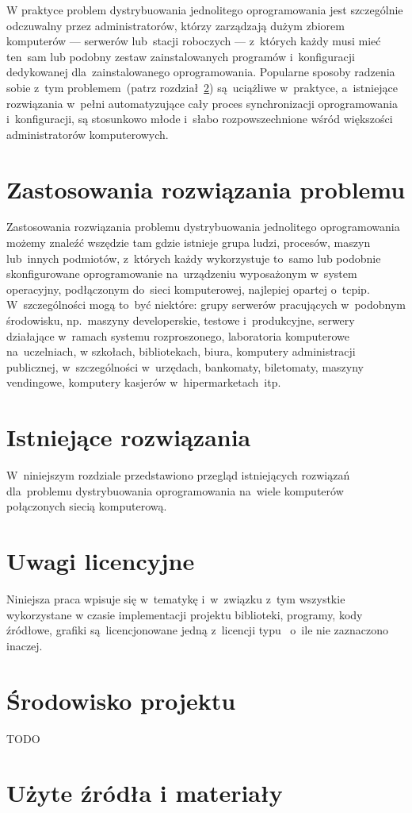 \documentclass[praca_magisterska]{subfiles}
\begin{document}
W praktyce problem dystrybuowania jednolitego oprogramowania jest szczególnie odczuwalny przez administratorów, którzy zarządzają dużym zbiorem komputerów --- serwerów lub~stacji roboczych --- z~których każdy musi mieć ten~sam lub podobny zestaw zainstalowanych programów i~konfiguracji dedykowanej dla~zainstalowanego oprogramowania. Popularne sposoby radzenia sobie z~tym problemem~(patrz rozdział~\ref{sec:istniejace-rozwiazania}) są~uciążliwe w~praktyce, a~istniejące rozwiązania w~pełni automatyzujące cały proces synchronizacji oprogramowania i~konfiguracji, są stosunkowo młode i~słabo rozpowszechnione wśród większości administratorów komputerowych.

\section{Zastosowania rozwiązania problemu}

Zastosowania rozwiązania problemu dystrybuowania jednolitego oprogramowania możemy znaleźć wszędzie tam gdzie istnieje grupa ludzi, procesów, maszyn lub~innych podmiotów, z~których każdy wykorzystuje to~samo lub podobnie skonfigurowane oprogramowanie na~urządzeniu wyposażonym w~system operacyjny, podłączonym do~sieci komputerowej, najlepiej opartej o~\gls{tcpip}. W~szczególności mogą to~być niektóre: grupy serwerów pracujących w~podobnym środowisku, np.~maszyny developerskie, testowe i~produkcyjne, serwery działające w~ramach systemu rozproszonego, laboratoria komputerowe na~uczelniach, w szkołach, bibliotekach, biura, komputery administracji publicznej, w~szczególności w~urzędach, bankomaty, biletomaty, maszyny vendingowe, komputery kasjerów w~hipermarketach~itp.

\section{Istniejące rozwiązania}
\label{sec:istniejace-rozwiazania}

W~niniejszym rozdziale przedstawiono przegląd istniejących rozwiązań dla~problemu dystrybuowania oprogramowania na~wiele komputerów połączonych siecią komputerową.

\section{Uwagi licencyjne}

Niniejsza praca wpisuje się w~tematykę  i~w~związku z~tym wszystkie wykorzystane w czasie implementacji projektu biblioteki, programy, kody źródłowe, grafiki są~licencjonowane jedną z~licencji typu~ o~ile nie zaznaczono inaczej.

\newpage

\section{Środowisko projektu}

TODO

\section{Użyte źródła i materiały}

\newpage
\end{document}
